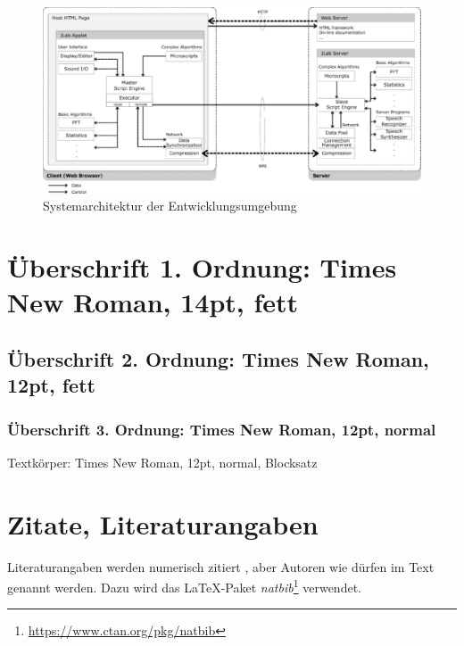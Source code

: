 \documentclass[12pt,a4paper]{article}
\begin{document}
\begin{figure}
  \centering
  \includegraphics[scale=.35]{abbildung_1}
  \caption{Systemarchitektur der Entwicklungsumgebung}
  \label{fig:abbildung_1}
\end{figure}

\section{Überschrift 1. Ordnung: Times New Roman, 14pt, fett}

\subsection{Überschrift 2. Ordnung: Times New Roman, 12pt, fett}

\subsubsection{Überschrift 3. Ordnung: Times New Roman, 12pt, normal}

Textkörper: Times New Roman, 12pt, normal, Blocksatz

\section{Zitate, Literaturangaben}

Literaturangaben werden numerisch zitiert \citep[z.B.][]{Fellbaum1999}, aber Autoren wie \citet{2003_ESSV_MM} dürfen im Text genannt werden.
Dazu wird das \LaTeX-Paket \emph{natbib}\footnote{\url{https://www.ctan.org/pkg/natbib}} verwendet.



\end{document}
